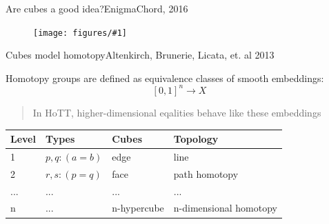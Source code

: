\documentclass[english,handout]{beamer}
\newcommand{\fig}[2]{
    \begin{figure}\begin{center}\texttt{[image: figures/\#1]}\caption{#2\label{#1}}\end{center}
    \end{figure}}
\begin{document}
\begin{frame}{Are cubes a good idea?}{EnigmaChord, 2016}

\fig{cube-joke.jpg}{}

\pause

\end{frame}


\begin{frame}{Cubes model homotopy}{Altenkirch, Brunerie, Licata, et. al 2013}
 
Homotopy groups are defined as equivalence classes of smooth embeddings:
$$[0,1]^n \rightarrow X$$

\begin{quotation}
In HoTT, higher-dimensional eqalities behave like these embeddings
\end{quotation}
\pause

    \begin{table}[]
        \begin{tabular}{@{}llll@{}}
        \toprule
        Level                & Types                & Cubes                 & Topology               \\ \midrule
        1                    & $p,q : (a = b)$        & edge                  & line                   \\
        2                    & $r,s : (p = q)$        & face                  & path homotopy          \\
        ... & ... & ... & ...   \\
        n                    & ... & n-hypercube           & n-dimensional homotopy \\ \bottomrule
        \end{tabular}
    \end{table}

%  
\end{frame}
\end{document}
